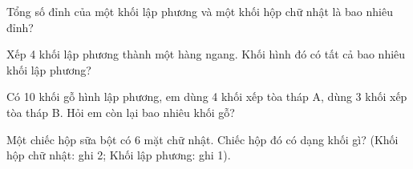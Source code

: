 \begin{ex} %
Tổng số đỉnh của một khối lập phương và một khối hộp chữ nhật là bao nhiêu đỉnh?
\end{ex}

\begin{ex} %
Xếp 4 khối lập phương thành một hàng ngang. Khối hình đó có tất cả bao nhiêu khối lập phương?
\end{ex}

\begin{ex} %
Có 10 khối gỗ hình lập phương, em dùng 4 khối xếp tòa tháp A, dùng 3 khối xếp tòa tháp B. Hỏi em còn lại bao nhiêu khối gỗ?
\end{ex}

\begin{ex} %
Một chiếc hộp sữa bột có 6 mặt chữ nhật. Chiếc hộp đó có dạng khối gì? (Khối hộp chữ nhật: ghi 2; Khối lập phương: ghi 1).
\end{ex}
